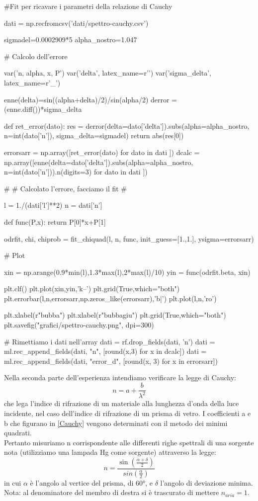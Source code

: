 \begin{sagesilent}
#Fit per ricavare i parametri della relazione di Cauchy

dati = np.recfromcsv('dati/spettro-cauchy.csv')

sigmadel=0.0002909*5
alpha_nostro=1.047

# Calcolo dell'errore

var('n, alpha, x, P')
var('delta', latex_name=r'\delta')
var('sigma_delta', latex_name=r'\sigma_{\delta}')

enne(delta)=sin((alpha+delta)/2)/sin(alpha/2)
derror = (enne.diff())*sigma_delta

def ret_error(dato):
  res = derror(delta=dato['delta']).subs(alpha=alpha_nostro, n=int(dato['n']), sigma_delta=sigmadel)
  return abs(res[0])

errorsarr = np.array([ret_error(dato) for dato in dati ])
dcalc = np.array([enne(delta=dato['delta']).subs(alpha=alpha_nostro, n=int(dato['n'])).n(digits=3) for dato in dati ])

#
# Calcolato l'errore, facciamo il fit
#

l = 1./(dati['l']**2)
n = dati['n']

def func(P,x):
    return P[0]*x+P[1]

odrfit, chi, chiprob = fit_chiquad(l, n, func, init_guess=[1.,1.], ysigma=errorsarr)


# Plot

xin = np.arange(0.9*min(l),1.3*max(l),2*max(l)/10)
yin = func(odrfit.beta, xin)

plt.clf()
plt.plot(xin,yin,'k--')
plt.grid(True,which="both")
plt.errorbar(l,n,errorsarr,np.zeros_like(errorsarr),'b|')
plt.plot(l,n,'ro')

plt.xlabel(r"bubba")
plt.xlabel(r"bubbagiu")
plt.grid(True,which="both")
plt.savefig("grafici/spettro-cauchy.png", dpi=300)

# Rimettiamo i dati nell'array
dati = rf.drop_fields(dati, 'n')
dati = ml.rec_append_fields(dati, "n", [round(x,3) for x in dcalc])
dati = ml.rec_append_fields(dati, "error_d", [round(x, 3) for x in errorsarr])
\end{sagesilent}

Nella seconda parte dell'esperienza intendiamo verificare la legge di Cauchy:
\begin{equation}
n = a + \frac{b}{\lambda^2}
\label{Cauchy}
\end{equation}
che lega l'indice di rifrazione di un materiale alla lunghezza d'onda della luce incidente, nel caso dell'indice di rifrazione di un prisma di vetro.
I coefficienti a e b che figurano in \ref{Cauchy} vengono determinati con il metodo dei minimi quadrati. \\
Pertanto misuriamo n corrispondente alle differenti righe spettrali di una sorgente nota (utilizziamo una lampada Hg come sorgente) attraverso la legge:
\begin{equation}
n = \frac{\sin(\frac{\alpha + \delta}{2})}{sin(\frac{\alpha}{2})}
\label{n}
\end{equation}
in cui $\alpha$ è l'angolo al vertice del prisma, di $60°$, e $\delta$ l'angolo di deviazione minima. Nota: al denominatore del membro di destra si è trascurato di mettere $n_{aria}=1$.\\


